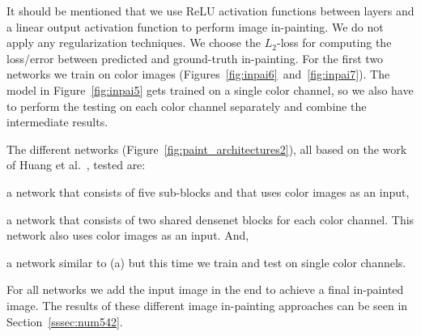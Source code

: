 It should be mentioned that we use ReLU activation functions between layers and a linear output activation function to perform image in-painting. We do not apply any regularization techniques. We choose the $L_2$-loss for computing the loss/error between predicted and ground-truth in-painting.  For the first two networks we train on color images (Figures~\ref{fig:inpai6}~and~\ref{fig:inpai7}). The model in Figure~\ref{fig:inpai5} gets trained on a single color channel, so we also have to perform the testing on each color channel separately and combine the intermediate results.


The different networks (Figure~\ref{fig:paint_architectures2}), all based on the work of Huang et al.~\cite{Huang16}, tested are: \begin{enumerate*}[label=(\alph*)] \item a network that consists of five sub-blocks and that uses color images as an input, \item a network that consists of two shared densenet blocks for each color channel. This network also uses color images as an input. And, \item a network similar to (a) but this time we train and test on single color channels.\end{enumerate*} For all networks we add the input image in the end to achieve a final in-painted image. The results of these different image in-painting approaches can be seen in Section~\ref{sssec:num542}.


